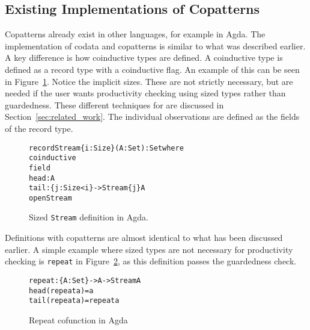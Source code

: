 


\subsection{Existing Implementations of Copatterns}
Copatterns already exist in other languages, for example in Agda\cite{Norell:thesis}. The implementation of codata and copatterns is similar to what was described earlier. A key difference is how coinductive types are defined. A coinductive type is defined as a record type with a coinductive flag. An example of this can be seen in Figure~\ref{fig:agda_stream}. Notice the implicit sizes. These are not strictly necessary, but are needed if the user wants productivity checking using sized types rather than guardedness. These different techniques for are discussed in Section~\ref{sec:related_work}. The individual observations are defined as the fields of the record type.

\begin{figure}
\begin{alltt}
record Stream \{i : Size\} (A : Set) : Set where
  coinductive
  field
    head : A
    tail : \{j : Size< i\} ->  Stream \{j\} A
open Stream
\end{alltt}
\caption{Sized \texttt{Stream} definition in Agda.}
\label{fig:agda_stream}
\end{figure}

Definitions with copatterns are almost identical to what has been discussed earlier. A simple example where sized types are not necessary for productivity checking is \texttt{repeat} in Figure~\ref{fig:agda_repeat}, as this definition passes the guardedness check.

\begin{figure}
\begin{alltt}
repeat : \{A : Set\} -> A -> Stream A
head (repeat a) = a
tail (repeat a) = repeat a 
\end{alltt}
\caption{Repeat cofunction in Agda}
\label{fig:agda_repeat}
\end{figure}

